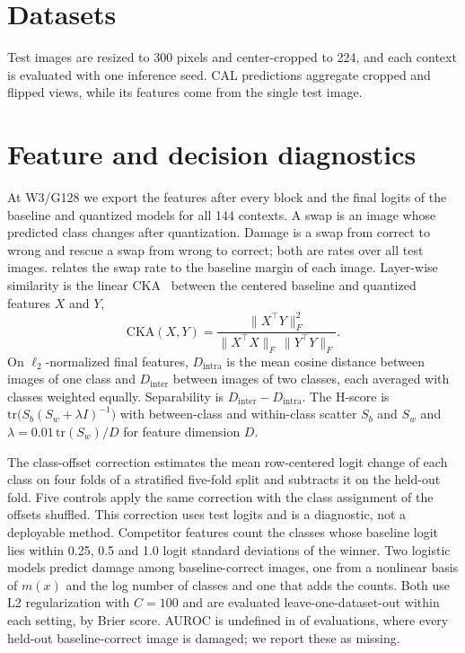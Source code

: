\section{Datasets}
\label{sec:datasets}



Test images are resized to 300 pixels and center-cropped to 224, and each context is evaluated with one inference seed.
CAL predictions aggregate cropped and flipped views, while its features come from the single test image.

\section{Feature and decision diagnostics}
\label{sec:diagnostics}

At W3/G128 we export the features after every block and the final logits of the baseline and quantized models for all 144 contexts.
A swap is an image whose predicted class changes after quantization.
Damage is a swap from correct to wrong and rescue a swap from wrong to correct; both are rates over all test images.
 relates the swap rate to the baseline margin of each image.
Layer-wise similarity is the linear CKA~\cite{kornblith2019similarity} between the centered baseline and quantized features $X$ and $Y$,
\begin{equation}
  \mathrm{CKA}(X, Y) = \frac{\lVert X^{\top} Y \rVert_F^2}{\lVert X^{\top} X \rVert_F \, \lVert Y^{\top} Y \rVert_F}.
  \label{eq:cka}
\end{equation}
On $\ell_2$-normalized final features, $D_{\mathrm{intra}}$ is the mean cosine distance between images of one class and $D_{\mathrm{inter}}$ between images of two classes, each averaged with classes weighted equally.
Separability is $D_{\mathrm{inter}} - D_{\mathrm{intra}}$.
The H-score is $\mathrm{tr}\big(S_b (S_w + \lambda I)^{-1}\big)$ with between-class and within-class scatter $S_b$ and $S_w$ and $\lambda = 0.01\,\mathrm{tr}(S_w)/D$ for feature dimension $D$.

The class-offset correction estimates the mean row-centered logit change of each class on four folds of a stratified five-fold split and subtracts it on the held-out fold.
Five controls apply the same correction with the class assignment of the offsets shuffled.
This correction uses test logits and is a diagnostic, not a deployable method.
Competitor features count the classes whose baseline logit lies within 0.25, 0.5 and 1.0 logit standard deviations of the winner.
Two logistic models predict damage among baseline-correct images, one from a nonlinear basis of $m(x)$ and the log number of classes and one that adds the counts.
Both use L2 regularization with $C=100$ and are evaluated leave-one-dataset-out within each setting, by Brier score.
AUROC is undefined in  of  evaluations, where every held-out baseline-correct image is damaged; we report these as missing.

